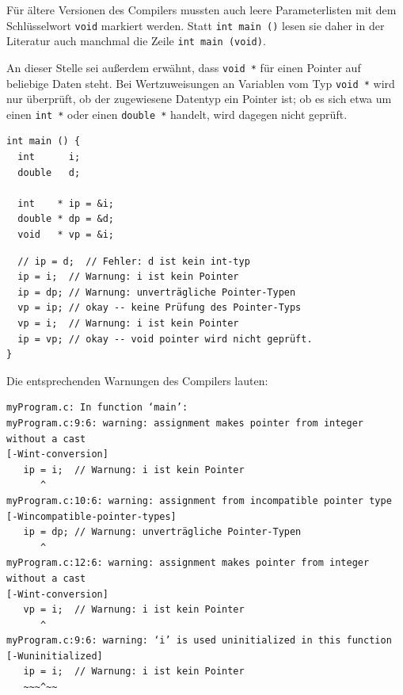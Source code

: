 Für ältere Versionen des Compilers mussten auch leere Parameterlisten mit dem Schlüsselwort \texttt{void} markiert werden. Statt \texttt{int main ()} lesen sie daher in der Literatur auch manchmal die Zeile \texttt{int main (void)}.

An dieser Stelle sei außerdem erwähnt, dass \texttt{void *} für einen Pointer auf beliebige Daten steht. Bei Wertzuweisungen an Variablen vom Typ \texttt{void *} wird nur überprüft, ob der zugewiesene Datentyp ein Pointer ist; ob es sich etwa um einen \texttt{int *} oder einen \texttt{double *} handelt, wird dagegen nicht geprüft.

\begin{codebox}
\begin{verbatim}
int main () {
  int      i;
  double   d;
  
  int    * ip = &i;
  double * dp = &d;
  void   * vp = &i;
\end{verbatim}
\end{codebox}

\begin{codebox}[]
\begin{verbatim}
  // ip = d;  // Fehler: d ist kein int-typ
  ip = i;  // Warnung: i ist kein Pointer
  ip = dp; // Warnung: unverträgliche Pointer-Typen
  vp = ip; // okay -- keine Prüfung des Pointer-Typs
  vp = i;  // Warnung: i ist kein Pointer
  ip = vp; // okay -- void pointer wird nicht geprüft.
}
\end{verbatim}
\end{codebox}

Die entsprechenden Warnungen des Compilers lauten:
\begin{cmdbox}
\begin{verbatim}
myProgram.c: In function ‘main’:
myProgram.c:9:6: warning: assignment makes pointer from integer without a cast 
[-Wint-conversion]
   ip = i;  // Warnung: i ist kein Pointer
      ^
myProgram.c:10:6: warning: assignment from incompatible pointer type 
[-Wincompatible-pointer-types]
   ip = dp; // Warnung: unverträgliche Pointer-Typen
      ^
myProgram.c:12:6: warning: assignment makes pointer from integer without a cast 
[-Wint-conversion]
   vp = i;  // Warnung: i ist kein Pointer
      ^
myProgram.c:9:6: warning: ‘i’ is used uninitialized in this function 
[-Wuninitialized]
   ip = i;  // Warnung: i ist kein Pointer
   ~~~^~~
\end{verbatim}
\end{cmdbox}

